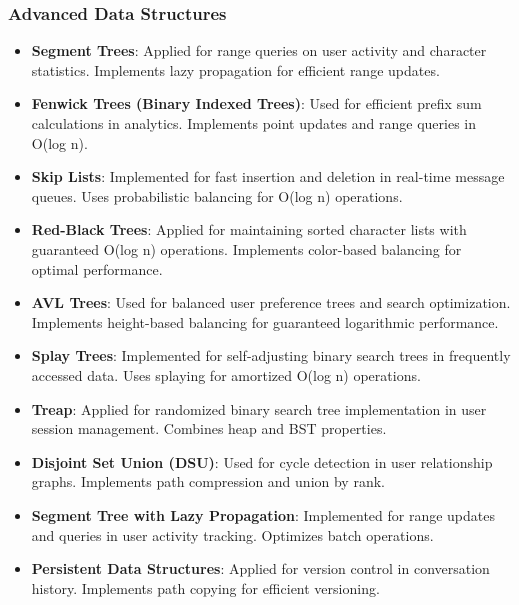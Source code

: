 \documentclass[conference]{IEEEtran}
\begin{document}
\subsubsection{Advanced Data Structures}
\begin{itemize}
\item \textbf{Segment Trees}: Applied for range queries on user activity and character statistics. Implements lazy propagation for efficient range updates.
\item \textbf{Fenwick Trees (Binary Indexed Trees)}: Used for efficient prefix sum calculations in analytics. Implements point updates and range queries in O(log n).
\item \textbf{Skip Lists}: Implemented for fast insertion and deletion in real-time message queues. Uses probabilistic balancing for O(log n) operations.
\item \textbf{Red-Black Trees}: Applied for maintaining sorted character lists with guaranteed O(log n) operations. Implements color-based balancing for optimal performance.
\item \textbf{AVL Trees}: Used for balanced user preference trees and search optimization. Implements height-based balancing for guaranteed logarithmic performance.
\item \textbf{Splay Trees}: Implemented for self-adjusting binary search trees in frequently accessed data. Uses splaying for amortized O(log n) operations.
\item \textbf{Treap}: Applied for randomized binary search tree implementation in user session management. Combines heap and BST properties.
\item \textbf{Disjoint Set Union (DSU)}: Used for cycle detection in user relationship graphs. Implements path compression and union by rank.
\item \textbf{Segment Tree with Lazy Propagation}: Implemented for range updates and queries in user activity tracking. Optimizes batch operations.
\item \textbf{Persistent Data Structures}: Applied for version control in conversation history. Implements path copying for efficient versioning.
\end{itemize}
\end{document}
